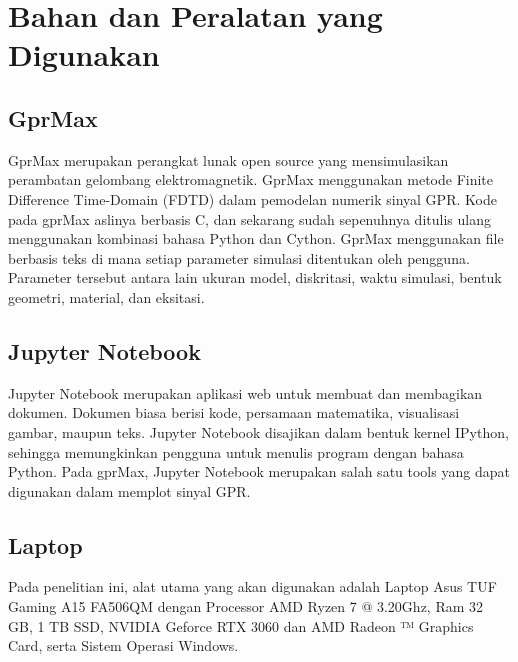 \section{Bahan dan Peralatan yang Digunakan}
\label{sec:bahanPeralatan}

\subsection{GprMax}
\label{subsec:GprMax}

GprMax merupakan perangkat lunak open source yang mensimulasikan perambatan gelombang elektromagnetik. 
GprMax menggunakan metode Finite Difference Time-Domain (FDTD) dalam pemodelan numerik sinyal GPR. 
Kode pada gprMax aslinya berbasis C, dan sekarang sudah sepenuhnya ditulis ulang menggunakan kombinasi bahasa Python dan Cython. 
GprMax menggunakan file berbasis teks di mana setiap parameter simulasi ditentukan oleh pengguna. 
Parameter tersebut antara lain ukuran model, diskritasi, waktu simulasi, bentuk geometri, material, dan eksitasi.

\subsection{Jupyter Notebook}
\label{subsec:jupyter}

Jupyter Notebook merupakan aplikasi web untuk membuat dan membagikan dokumen. 
Dokumen biasa berisi kode, persamaan matematika, visualisasi gambar, maupun teks. 
Jupyter Notebook disajikan dalam bentuk kernel IPython, sehingga memungkinkan pengguna untuk menulis program dengan bahasa Python. 
Pada gprMax, Jupyter Notebook merupakan salah satu tools yang dapat digunakan dalam memplot sinyal GPR.

\subsection{Laptop}
\label{subsec:laptop}

Pada penelitian ini, alat utama yang akan digunakan adalah Laptop Asus TUF Gaming A15 FA506QM dengan Processor AMD Ryzen 7 @ 3.20Ghz, 
Ram 32 GB, 1 TB SSD, NVIDIA Geforce RTX 3060 dan AMD Radeon ™ Graphics Card, serta Sistem Operasi Windows.
